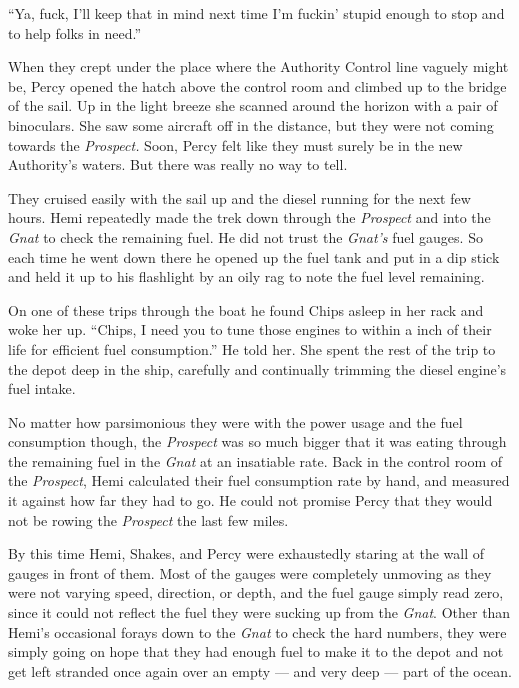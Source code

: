 \documentclass[]{scrbook}
\begin{document}
``Ya, fuck, I'll keep that in mind next time I'm fuckin' stupid enough
to stop and to help folks in need.''

When they crept under the place where the Authority Control line vaguely
might be, Percy opened the hatch above the control room and climbed up
to the bridge of the sail. Up in the light breeze she scanned around the
horizon with a pair of binoculars. She saw some aircraft off in the
distance, but they were not coming towards the \emph{Prospect.} Soon,
Percy felt like they must surely be in the new Authority's waters. But
there was really no way to tell.

They cruised easily with the sail up and the diesel running for the next
few hours. Hemi repeatedly made the trek down through the
\emph{Prospect} and into the \emph{Gnat} to check the remaining fuel. He
did not trust the \emph{Gnat's} fuel gauges. So each time he went down
there he opened up the fuel tank and put in a dip stick and held it up
to his flashlight by an oily rag to note the fuel level remaining.

On one of these trips through the boat he found Chips asleep in her rack
and woke her up. ``Chips, I need you to tune those engines to within a
inch of their life for efficient fuel consumption.'' He told her. She
spent the rest of the trip to the depot deep in the ship, carefully and
continually trimming the diesel engine's fuel intake.

No matter how parsimonious they were with the power usage and the fuel
consumption though, the \emph{Prospect} was so much bigger that it was
eating through the remaining fuel in the \emph{Gnat} at an insatiable
rate. Back in the control room of the \emph{Prospect}, Hemi calculated
their fuel consumption rate by hand, and measured it against how far
they had to go. He could not promise Percy that they would not be rowing
the \emph{Prospect} the last few miles.

By this time Hemi, Shakes, and Percy were exhaustedly staring at the
wall of gauges in front of them. Most of the gauges were completely
unmoving as they were not varying speed, direction, or depth, and the
fuel gauge simply read zero, since it could not reflect the fuel they
were sucking up from the \emph{Gnat}. Other than Hemi's occasional
forays down to the \emph{Gnat} to check the hard numbers, they were
simply going on hope that they had enough fuel to make it to the depot
and not get left stranded once again over an empty --- and very deep ---
part of the ocean.
\end{document}
